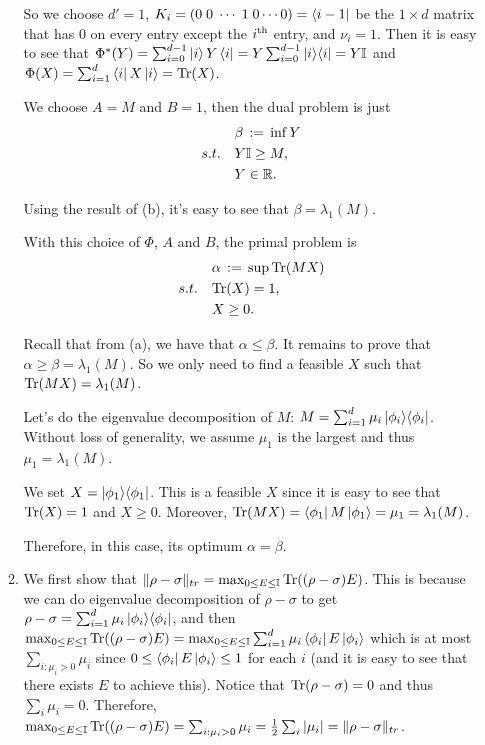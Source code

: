 \documentclass[12pt]{article}
\begin{document}
\begin{enumerate}
\begin{enumerate}
So we choose $d' = 1$, $K_i = (0 \; 0 \; \cdots \; 1 \; 0 \cdots 0) = \bra{i - 1}$ be the $1 \times d$ matrix that has 0 on every entry except the $i\textsuperscript{th}$ entry, and $\nu_i = 1$. Then it is easy to see that $\Phi^*(Y) = \sum_{i = 0}^{d - 1} \ket{i} Y \bra{i} = Y \sum_{i = 0}^{d - 1} \ket{i}\!\bra{i} = Y \mathbb{I}$ and $\Phi(X) = \sum_{i = 1}^d \bra{i} X \ket{i} = \mathrm{Tr}(X)$.

We choose $A = M$ and $B = 1$, then the dual problem is just
\begin{align}
&\beta\,:=\,  \inf Y \notag\\
s.t.\quad&  Y\mathbb{I}\geq M,\notag\\
\qquad &Y \in \mathbb{R}.\notag
\end{align}

Using the result of (b), it's easy to see that $\beta = \lambda_1(M)$.

With this choice of $\Phi$, $A$ and $B$, the primal problem is
\begin{align}
&\alpha\,:=\,  \sup \mathrm{Tr}(MX)\notag \\
s.t.\quad& \mathrm{Tr}(X)=1,\notag \\
& X \geq 0.\notag
\end{align}

Recall that from (a), we have that $\alpha \leq \beta$. It remains to prove that $\alpha \geq \beta = \lambda_1(M)$. So we only need to find a feasible $X$ such that $\mathrm{Tr}(MX) = \lambda_1(M)$. 

Let's do the eigenvalue decomposition of $M$: $M = \sum_{i = 1}^d \mu_i \ket{\phi_i}\!\bra{\phi_i}$. Without loss of generality, we assume $\mu_1$ is the largest and thus $\mu_1 = \lambda_1(M)$. 

We set $X = \ket{\phi_1}\!\bra{\phi_1}$. This is a feasible $X$ since it is easy to see that $\mathrm{Tr}(X) = 1$ and $X \ge 0$. Moreover, $\mathrm{Tr}(MX) = \bra{\phi_1}M\ket{\phi_1} = \mu_1 =  \lambda_1(M)$.

Therefore, in this case, its optimum $\alpha = \beta$.
\item We first show that $\|\rho - \sigma\|_{tr} = \max_{0 \leq E \leq \mathbb{I}}\mathrm{Tr}( (\rho - \sigma) E)$. This is because we can do eigenvalue decomposition of $\rho - \sigma$ to get $\rho - \sigma = \sum_{i = 1}^d \mu_i \ket{\phi_i}\!\bra{\phi_i}$, and then $\max_{0 \leq E \leq \mathbb{I}}\mathrm{Tr}( (\rho - \sigma) E) = \max_{0 \leq E \leq \mathbb{I}}\sum_{i = 1}^d \mu_i \bra{\phi_i} E \ket{\phi_i}$ which is at most $\sum_{i: \mu_i > 0}\mu_i$ since $ 0 \leq \bra{\phi_i} E \ket{\phi_i} \leq 1$ for each $i$ (and it is easy to see that there exists $E$ to achieve this). Notice that $\mathrm{Tr}(\rho - \sigma) = 0$ and thus $\sum_i \mu_i = 0$. Therefore, $\max_{0 \leq E \leq \mathbb{I}}\mathrm{Tr}( (\rho - \sigma) E) = \sum_{i:\mu_i > 0}\mu_i = \frac{1}{2}\sum_i |\mu_i| = \|\rho - \sigma\|_{tr}$.


\end{enumerate}
\end{enumerate}
\end{document}
